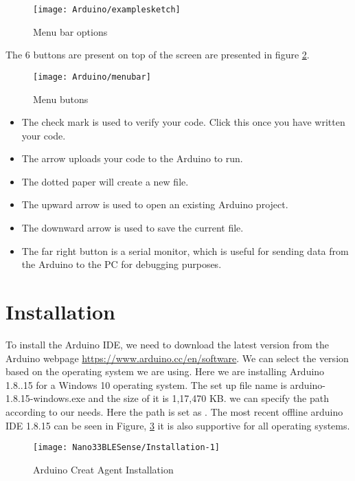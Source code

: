 \begin{figure}
	\centering
	\texttt{[image: Arduino/examplesketch]}
	\caption{Menu bar options}\label{ArduinoIDEexamplesketch}
\end{figure}

The 6 buttons are present on top of the screen are presented in figure \ref{ArduinoIDEmenubar}.

\begin{figure}
	\centering
	\texttt{[image: Arduino/menubar]}
	\caption{Menu butons}\label{ArduinoIDEmenubar}
\end{figure}

\begin{itemize}
	\item	The check mark is used to verify your code. Click this once you have written your code.
	\item	The arrow uploads your code to the Arduino to run.
	\item	The dotted paper will create a new file.
	\item	The upward arrow is used to open an existing Arduino project.
	\item	The downward arrow is used to save the current file.
	\item	The far right button is a serial monitor, which is useful for sending data from the Arduino to the PC for debugging purposes.
\end{itemize}


\section{Installation}

To install the Arduino IDE, we need to download the latest version from the Arduino webpage \url{https://www.arduino.cc/en/software}. We can select the version based on the operating system we are using. Here we are installing Arduino 1.8..15 for a Windows 10 operating system. 
The set up file name is arduino-1.8.15-windows.exe and the size of it is 1,17,470 KB. we can specify the path according to our needs. Here the path is set as  . The most recent offline arduino IDE 1.8.15 can be seen in Figure, \ref{fig:arduino-creat-agent-installieren} it is also supportive for all operating systems.

\begin{figure}[h]
    \centering
    \texttt{[image: Nano33BLESense/Installation-1]}
    \caption{Arduino Creat Agent Installation}
    \label{fig:arduino-creat-agent-installieren}
\end{figure}

